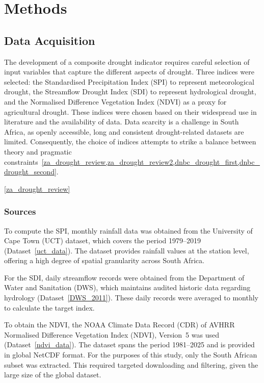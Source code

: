 \graphicspath{{methods/fig/}}

\chapter{Methods}
\label{chap:methods}
\section{Data Acquisition}
The development of a composite drought indicator requires careful selection of input variables that capture the different aspects of drought. Three indices were selected: the Standardised Precipitation Index (SPI) to represent meteorological drought, the Streamflow Drought Index (SDI) to represent hydrological drought, and the Normalised Difference Vegetation Index (NDVI) as a proxy for agricultural drought. These indices were chosen based on their widespread use in literature and the availability of data. Data scarcity is a challenge in South Africa, as openly accessible, long and consistent drought-related datasets are limited. Consequently, the choice of indices attempts to strike a balance between theory and pragmatic constraints~\ref{za_drought_review,za_drought_review2,dnbc_drought_first,dnbc_drought_second}.

\ref{za_drought_review}


\subsection{Sources}
To compute the SPI, monthly rainfall data was obtained from the University of Cape Town (UCT) dataset, which covers the period 1979–2019 (Dataset~\ref{uct_data}). The dataset provides rainfall values at the station level, offering a high degree of spatial granularity across South Africa.

For the SDI, daily streamflow records were obtained from the Department of Water and Sanitation (DWS), which maintains audited historic data regarding hydrology (Dataset~\ref{DWS_2011}). These daily records were averaged to monthly to calculate the target index.

To obtain the NDVI, the NOAA Climate Data Record (CDR) of AVHRR Normalised Difference Vegetation Index (NDVI), Version~5 was used (Dataset~\ref{ndvi_data}). The dataset spans the period 1981–2025 and is provided in global NetCDF format. For the purposes of this study, only the South African subset was extracted. This required targeted downloading and filtering, given the large size of the global dataset.

